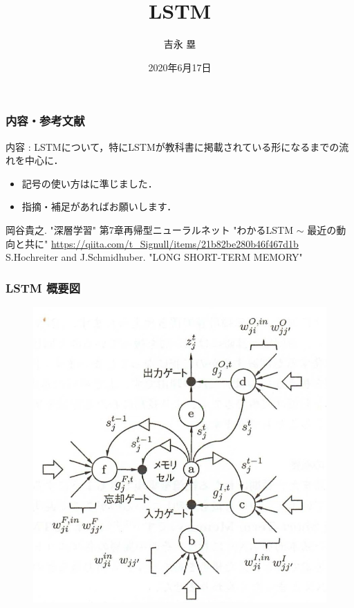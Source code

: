 \documentclass[dvipdfmx]{beamer}
\title{LSTM}
\author{吉永 塁}
\date{2020年6月17日}
\newcommand{\fuee}{:;($\cap \ \acute{}$ \uwave{$\quad \ $} $\grave{} \ \cap$);:}
\begin{document}
\begin{frame}
    \titlepage
\end{frame}


\begin{frame}
    \frametitle{内容・参考文献}
    内容 : LSTMについて，特にLSTMが教科書\cite{blue}に掲載されている形になるまでの流れを中心に．
    \begin{itemize}
        \item 記号の使い方は\cite{blue}に準じました．
        \item 指摘・補足があればお願いします．
    \end{itemize}

    \vspace{\baselineskip}

    \begin{thebibliography}{9}
        \beamertemplatetextbibitems
          岡谷貴之. "深層学習" 第7章再帰型ニューラルネット
         "わかるLSTM $\sim$ 最近の動向と共に"
        {\footnotesize \url{https://qiita.com/t_Signull/items/21b82be280b46f467d1b}}
         S.Hochreiter and J.Schmidhuber. "LONG SHORT-TERM MEMORY"
    \end{thebibliography}
\end{frame}


\begin{frame}
    \frametitle{LSTM 概要図}
    \begin{figure}
        \centering
        \includegraphics[scale=0.25]{figure/lstm.png}
    \end{figure}
    \flushright{{\small \fuee}}
\end{frame}
\end{document}
